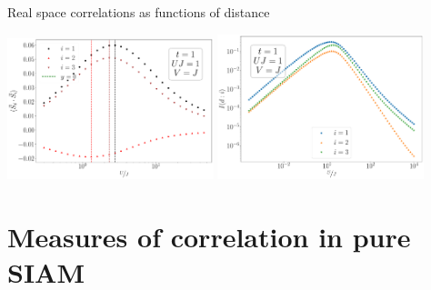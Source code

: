 \documentclass[aspectratio=169]{beamer}
\begin{document}
\begin{frame}[noframenumbering]{Real space correlations as functions of distance}

\begin{center}
\includegraphics[width=0.45\textwidth]{figures/corr-all-t=1.000,J=1_over_U,V=J,N=4,U=0.016,100.000,95.pdf}
\includegraphics[width=0.45\textwidth]{figures/I-all-t=1.000,J=1_over_U,V=J,N=4,U=0.016,100.000,95.pdf}
\end{center}

\end{frame}

\section{Measures of correlation in pure SIAM}
\end{document}
